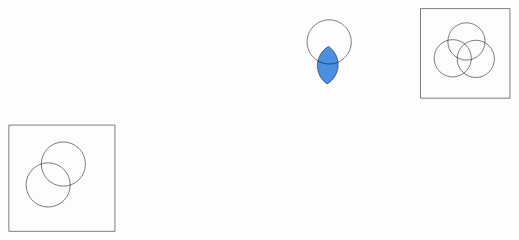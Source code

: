 \documentclass[12pt]{article}
\begin{document}
\[\begin{tikzpicture}[x=0.75pt,y=0.75pt,yscale=-1.08,xscale=1.08]
    \draw  [color={rgb, 255:red, 0; green, 0; blue, 0 }  ,draw opacity=1 ][fill={rgb, 255:red, 74; green, 144; blue, 226 }  ,fill opacity=1 ] (479.01,188.21) .. controls (477.04,191.57) and (474.3,194.2) .. (471.14,196.01) .. controls (461.81,189.68) and (458.88,177.1) .. (464.67,167.24) .. controls (466.64,163.88) and (469.38,161.25) .. (472.53,159.44) .. controls (481.86,165.78) and (484.8,178.35) .. (479.01,188.21) -- cycle ;
    \draw   (484.15,136.42) .. controls (494.43,142.46) and (497.87,155.68) .. (491.83,165.96) .. controls (485.8,176.23) and (472.58,179.67) .. (462.3,173.64) .. controls (452.02,167.6) and (448.58,154.38) .. (454.62,144.11) .. controls (460.65,133.83) and (473.87,130.39) .. (484.15,136.42) -- cycle ;
    \draw   (562.51,122.51) -- (650,122.51) -- (650,210) -- (562.51,210) -- cycle ;
    \draw   (589.25,154.6) .. controls (589.25,144.55) and (597.4,136.4) .. (607.45,136.4) .. controls (617.49,136.4) and (625.64,144.55) .. (625.64,154.6) .. controls (625.64,164.65) and (617.49,172.79) .. (607.45,172.79) .. controls (597.4,172.79) and (589.25,164.65) .. (589.25,154.6) -- cycle ;
    \draw   (575.81,171.01) .. controls (575.81,160.96) and (583.95,152.81) .. (594,152.81) .. controls (604.05,152.81) and (612.2,160.96) .. (612.2,171.01) .. controls (612.2,181.06) and (604.05,189.21) .. (594,189.21) .. controls (583.95,189.21) and (575.81,181.06) .. (575.81,171.01) -- cycle ;
    \draw   (598.38,171.6) .. controls (598.38,161.55) and (606.53,153.41) .. (616.58,153.41) .. controls (626.63,153.41) and (634.77,161.55) .. (634.77,171.6) .. controls (634.77,181.65) and (626.63,189.8) .. (616.58,189.8) .. controls (606.53,189.8) and (598.38,181.65) .. (598.38,171.6) -- cycle ;
    \draw   (160,236.26) -- (263.74,236.26) -- (263.74,340) -- (160,340) -- cycle ;
    \draw   (191.7,274.3) .. controls (191.7,262.38) and (201.36,252.72) .. (213.28,252.72) .. controls (225.2,252.72) and (234.86,262.38) .. (234.86,274.3) .. controls (234.86,286.22) and (225.2,295.88) .. (213.28,295.88) .. controls (201.36,295.88) and (191.7,286.22) .. (191.7,274.3) -- cycle ;
    \draw   (176.85,294.68) .. controls (176.85,282.76) and (186.51,273.1) .. (198.42,273.1) .. controls (210.34,273.1) and (220,282.76) .. (220,294.68) .. controls (220,306.6) and (210.34,316.26) .. (198.42,316.26) .. controls (186.51,316.26) and (176.85,306.6) .. (176.85,294.68) -- cycle ;

\end{tikzpicture}\]
\end{document}
